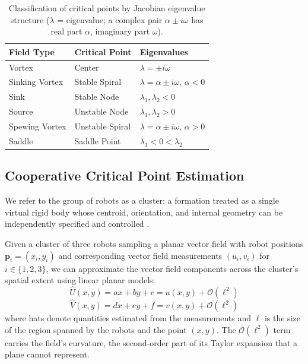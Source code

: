 \documentclass[lettersize,journal]{IEEEtran}
\begin{document}
\begin{table}[!t]
    \centering
    \caption{Classification of critical points by Jacobian eigenvalue structure ($\lambda$ = eigenvalue; a complex pair $\alpha \pm i\omega$ has real part $\alpha$, imaginary part $\omega$).}
    \label{tab:field_summary}
    \begin{tabular}{lll}
    \hline
    \textbf{Field Type} & \textbf{Critical Point} & \textbf{Eigenvalues} \\
    \hline
    Vortex & Center & $\lambda = \pm i\omega$ \\
    Sinking Vortex & Stable Spiral & $\lambda = \alpha \pm i\omega$, $\alpha < 0$ \\
    Sink & Stable Node & $\lambda_1, \lambda_2 < 0$ \\
    Source & Unstable Node & $\lambda_1, \lambda_2 > 0$ \\
    Spewing Vortex & Unstable Spiral & $\lambda = \alpha \pm i\omega$, $\alpha > 0$ \\
    Saddle & Saddle Point & $\lambda_1 < 0 < \lambda_2$ \\
    \hline
    \end{tabular}
\end{table}


\subsection{Cooperative Critical Point Estimation}
\noindent

We refer to the group of robots as a cluster: a formation treated as a single virtual rigid body whose centroid, orientation, and internal geometry can be independently specified and controlled \cite{50,51}.

Given a cluster of three robots sampling a planar vector field with robot positions $\mathbf{p}_i = (x_i, y_i)$ and corresponding vector field measurements $(u_i, v_i)$ for $i \in \{1, 2, 3\}$, we can approximate the vector field components across the cluster's spatial extent using linear planar models:
\begin{equation}\label{eq:2}
\hat{U}(x,y) = ax + by + c = u(x,y) + \mathcal{O}(\ell^2)
\end{equation}
\begin{equation}\label{eq:3}
\hat{V}(x,y) = dx + ey + f = v(x,y) + \mathcal{O}(\ell^2)
\end{equation}
where hats denote quantities estimated from the measurements and $\ell$ is the size of the region spanned by the robots and the point $(x,y)$. The $\mathcal{O}(\ell^2)$ term carries the field's curvature, the second-order part of its Taylor expansion that a plane cannot represent.
\end{document}

